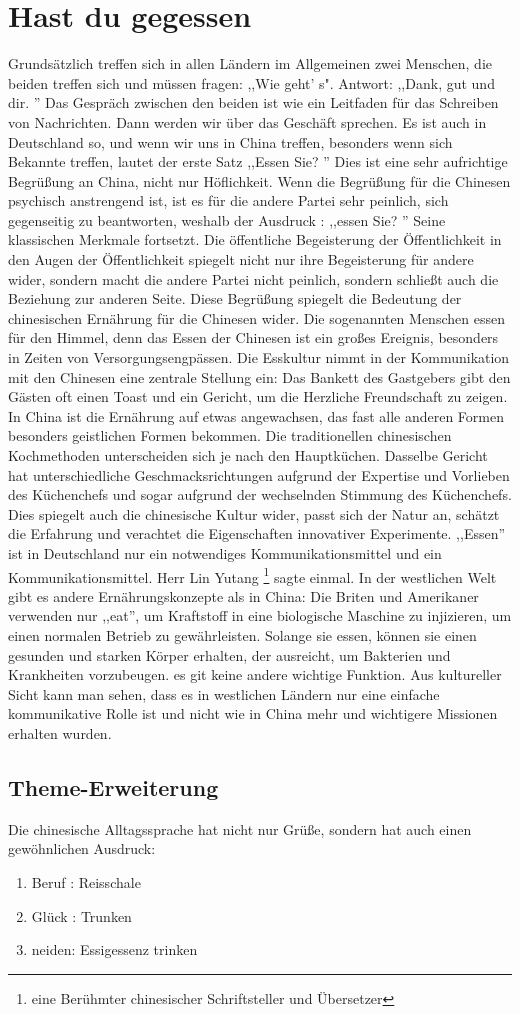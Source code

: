 \section{Hast du gegessen}
Grundsätzlich treffen sich in allen Ländern im Allgemeinen zwei Menschen,  die beiden treffen sich und müssen fragen: ,,Wie geht' s". Antwort: ,,Dank,  gut und dir. '' Das Gespräch zwischen den beiden ist wie ein Leitfaden für das Schreiben von Nachrichten.  Dann werden wir über das Geschäft sprechen.  Es ist auch in Deutschland so, und wenn wir uns in China treffen, besonders wenn sich Bekannte treffen, lautet der erste Satz ,,Essen Sie? '' Dies ist eine sehr aufrichtige Begrü\ss ung an China, nicht nur Höflichkeit.
\mypar
Wenn die Begrü\ss ung für die Chinesen psychisch anstrengend ist, ist es für die andere Partei sehr peinlich, sich gegenseitig zu beantworten, weshalb der Ausdruck : ,,essen Sie? '' Seine klassischen Merkmale fortsetzt. Die öffentliche Begeisterung der Öffentlichkeit in den Augen der Öffentlichkeit spiegelt nicht nur ihre Begeisterung für andere wider, sondern macht die andere Partei nicht peinlich, sondern schlie\ss t auch die Beziehung zur anderen Seite.
\mypar
Diese Begrü\ss ung spiegelt die Bedeutung der chinesischen Ernährung für die Chinesen wider. Die sogenannten Menschen essen für den Himmel, denn das Essen der Chinesen ist ein gro\ss es Ereignis, besonders in Zeiten von Versorgungsengpässen. Die Esskultur nimmt in der Kommunikation mit den Chinesen eine zentrale Stellung ein: Das Bankett des Gastgebers gibt den Gästen oft einen Toast und ein Gericht, um die Herzliche Freundschaft  zu zeigen. In China ist die Ernährung auf etwas angewachsen, das fast alle anderen Formen besonders geistlichen Formen bekommen.
\mypar
Die traditionellen chinesischen Kochmethoden unterscheiden sich je nach den Hauptküchen. Dasselbe Gericht hat unterschiedliche Geschmacksrichtungen aufgrund der Expertise und Vorlieben des Küchenchefs und sogar aufgrund der wechselnden Stimmung des Küchenchefs. Dies spiegelt auch die chinesische Kultur wider, passt sich der Natur an, schätzt die Erfahrung und verachtet die Eigenschaften innovativer Experimente.
\mypar
,,Essen'' ist in Deutschland nur ein notwendiges Kommunikationsmittel und ein Kommunikationsmittel. Herr Lin Yutang \footnote{eine Berühmter chinesischer Schriftsteller und Übersetzer} sagte einmal. In der westlichen Welt gibt es andere Ernährungskonzepte als in China: Die Briten und Amerikaner verwenden nur ,,eat'', um Kraftstoff in eine biologische Maschine zu injizieren, um einen normalen Betrieb zu gewährleisten. Solange sie essen, können sie einen gesunden und starken Körper erhalten, der ausreicht, um Bakterien und Krankheiten vorzubeugen. es git keine andere wichtige Funktion.  Aus kultureller Sicht kann man sehen, dass es in westlichen Ländern nur eine einfache kommunikative Rolle ist und nicht wie in China mehr und wichtigere Missionen erhalten wurden.

\subsection{Theme-Erweiterung}
Die chinesische Alltagssprache hat nicht nur Grü\ss e, sondern hat auch einen gew\"ohnlichen Ausdruck:
\begin{enumerate}
	\item Beruf :  Reisschale
	\item Glück : Trunken
	\item neiden:  Essigessenz trinken
\end{enumerate}